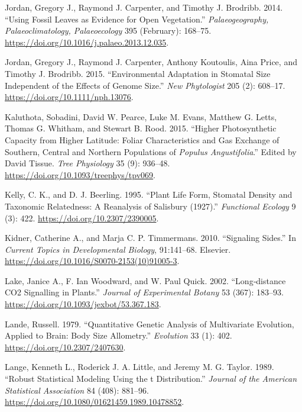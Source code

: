 \documentclass[
  12pt,
]{article}
\newlength{\cslhangindent}
\newlength{\cslentryspacingunit} %
\newenvironment{CSLReferences}[2] %
 {%
  \setlength{\parindent}{0pt}
  \ifodd #1
  \let\oldpar\par
  \def\par{\hangindent=\cslhangindent\oldpar}
  \fi
  \setlength{\parskip}{#2\cslentryspacingunit}
 }%
 {}
\begin{document}
\begin{CSLReferences}{1}{0}
\leavevmode{}%
Jordan, Gregory J., Raymond J. Carpenter, and Timothy J. Brodribb. 2014. {``Using Fossil Leaves as Evidence for Open Vegetation.''} \emph{Palaeogeography, Palaeoclimatology, Palaeoecology} 395 (February): 168--75. \url{https://doi.org/10.1016/j.palaeo.2013.12.035}.

\leavevmode{}%
Jordan, Gregory J., Raymond J. Carpenter, Anthony Koutoulis, Aina Price, and Timothy J. Brodribb. 2015. {``Environmental Adaptation in Stomatal Size Independent of the Effects of Genome Size.''} \emph{New Phytologist} 205 (2): 608--17. \url{https://doi.org/10.1111/nph.13076}.

\leavevmode{}%
Kaluthota, Sobadini, David W. Pearce, Luke M. Evans, Matthew G. Letts, Thomas G. Whitham, and Stewart B. Rood. 2015. {``Higher Photosynthetic Capacity from Higher Latitude: Foliar Characteristics and Gas Exchange of Southern, Central and Northern Populations of \emph{{Populus} Angustifolia}.''} Edited by David Tissue. \emph{Tree Physiology} 35 (9): 936--48. \url{https://doi.org/10.1093/treephys/tpv069}.

\leavevmode{}%
Kelly, C. K., and D. J. Beerling. 1995. {``Plant {Life} {Form}, {Stomatal} {Density} and {Taxonomic} {Relatedness}: {A} {Reanalysis} of {Salisbury} (1927).''} \emph{Functional Ecology} 9 (3): 422. \url{https://doi.org/10.2307/2390005}.

\leavevmode{}%
Kidner, Catherine A., and Marja C. P. Timmermans. 2010. {``Signaling {Sides}.''} In \emph{Current {Topics} in {Developmental} {Biology}}, 91:141--68. Elsevier. \url{https://doi.org/10.1016/S0070-2153(10)91005-3}.

\leavevmode{}%
Lake, Janice A., F. Ian Woodward, and W. Paul Quick. 2002. {``Long‐distance {CO2} Signalling in Plants.''} \emph{Journal of Experimental Botany} 53 (367): 183--93. \url{https://doi.org/10.1093/jexbot/53.367.183}.

\leavevmode{}%
Lande, Russell. 1979. {``Quantitative {Genetic} {Analysis} of {Multivariate} {Evolution}, {Applied} to {Brain}: {Body} {Size} {Allometry}.''} \emph{Evolution} 33 (1): 402. \url{https://doi.org/10.2307/2407630}.

\leavevmode{}%
Lange, Kenneth L., Roderick J. A. Little, and Jeremy M. G. Taylor. 1989. {``Robust {Statistical} {Modeling} {Using} the t {Distribution}.''} \emph{Journal of the American Statistical Association} 84 (408): 881--96. \url{https://doi.org/10.1080/01621459.1989.10478852}.


\end{CSLReferences}
\end{document}
